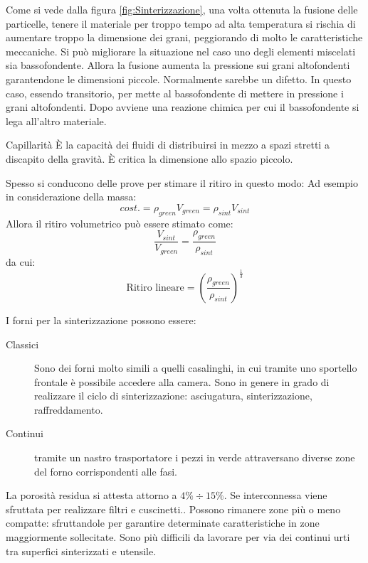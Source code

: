 Come si vede dalla figura \ref{fig:Sinterizzazione}, una volta ottenuta la fusione delle particelle, tenere il materiale per troppo tempo ad alta temperatura si rischia di aumentare troppo la dimensione dei grani, peggiorando di molto le caratteristiche meccaniche.
Si può migliorare la situazione nel caso uno degli elementi miscelati sia bassofondente.
Allora la fusione aumenta la pressione sui grani altofondenti garantendone le dimensioni piccole.
Normalmente sarebbe un difetto. In questo caso, essendo transitorio, per mette al bassofondente di mettere in pressione i grani altofondenti. Dopo avviene una reazione chimica per cui il bassofondente si lega all'altro materiale.

\begin{definition}{Capillarità}
È la capacità dei fluidi di distribuirsi in mezzo a spazi stretti a discapito della gravità. È critica la dimensione allo spazio piccolo.
\end{definition}

Spesso si conducono delle prove per stimare il ritiro in questo modo:
Ad esempio in considerazione della massa:
\begin{equation}
cost. = \rho_{green} V_{green} = \rho_{sint} V_{sint} 
\end{equation}
Allora il ritiro volumetrico può essere stimato come:
\begin{equation}
\frac{V_{sint}}{V_{green}} = \frac{\rho_{green}}{\rho_{sint}}
\end{equation}
da cui:
\begin{equation}
\text{Ritiro lineare} = \left(\frac{\rho_{green}}{\rho_{sint}}\right)^{\frac{1}{3}}
\end{equation}

I forni per la sinterizzazione possono essere:
\begin{description}
\item[Classici] Sono dei forni molto simili a quelli casalinghi, in cui tramite uno sportello frontale è possibile accedere alla camera. Sono in genere in grado di realizzare il ciclo di sinterizzazione: asciugatura, sinterizzazione, raffreddamento.
\item[Continui] tramite un nastro trasportatore i pezzi in verde attraversano diverse zone del forno corrispondenti alle fasi.
\end{description}

La porosità residua si attesta attorno a $4\% \div 15\%$.
Se interconnessa viene sfruttata per realizzare filtri e cuscinetti..
Possono rimanere zone più o meno compatte: sfruttandole per garantire determinate caratteristiche in zone maggiormente sollecitate.
Sono più difficili da lavorare per via dei continui urti tra superfici sinterizzati e utensile.

